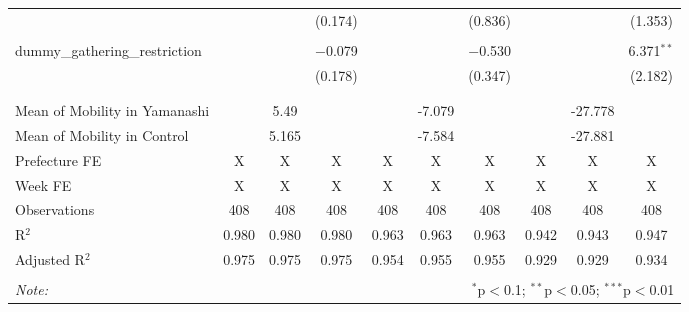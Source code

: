 \begin{sidewaystable}[!htbp]
\begin{tabular}{@{\extracolsep{5pt}}lccccccccc}
  &  &  & (0.174) &  &  & (0.836) &  &  & (1.353) \\ 
  & & & & & & & & & \\ 
 dummy\_gathering\_restriction &  &  & $-$0.079 &  &  & $-$0.530 &  &  & 6.371$^{**}$ \\ 
  &  &  & (0.178) &  &  & (0.347) &  &  & (2.182) \\ 
  & & & & & & & & & \\ 
\hline \\[-1.8ex] 
Mean of Mobility in Yamanashi &  & 5.49 &  &  & -7.079 &  &  & -27.778 &  \\ 
Mean of Mobility in Control &  & 5.165 &  &  & -7.584 &  &  & -27.881 &  \\ 
Prefecture FE & X & X & X & X & X & X & X & X & X \\ 
Week FE & X & X & X & X & X & X & X & X & X \\ 
Observations & 408 & 408 & 408 & 408 & 408 & 408 & 408 & 408 & 408 \\ 
R$^{2}$ & 0.980 & 0.980 & 0.980 & 0.963 & 0.963 & 0.963 & 0.942 & 0.943 & 0.947 \\ 
Adjusted R$^{2}$ & 0.975 & 0.975 & 0.975 & 0.954 & 0.955 & 0.955 & 0.929 & 0.929 & 0.934 \\ 
\hline 
\hline \\[-1.8ex] 
\textit{Note:}  & \multicolumn{9}{r}{$^{*}$p$<$0.1; $^{**}$p$<$0.05; $^{***}$p$<$0.01} \\ 
\end{tabular} 
\end{sidewaystable} 
